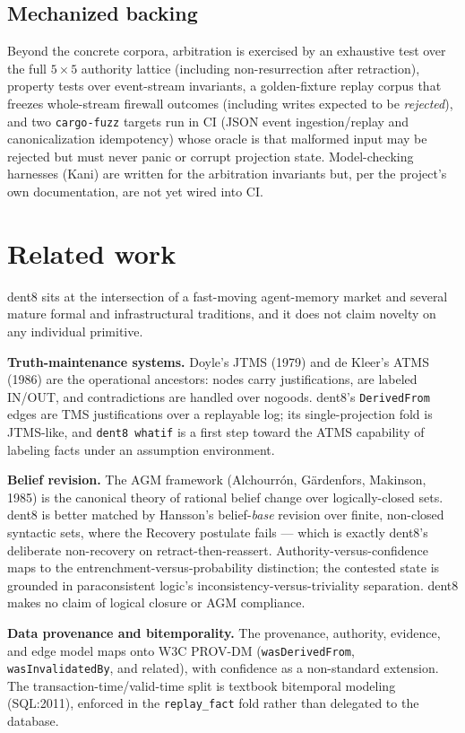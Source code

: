 \documentclass[11pt]{article}
\newcommand{\code}[1]{\texttt{#1}}
\begin{document}
\subsection{Mechanized backing}

Beyond the concrete corpora, arbitration is exercised by an exhaustive test over the full $5\times5$ authority lattice (including non-resurrection after retraction), property tests over event-stream invariants, a golden-fixture replay corpus that freezes whole-stream firewall outcomes (including writes expected to be \emph{rejected}), and two \code{cargo-fuzz} targets run in CI (JSON event ingestion/replay and canonicalization idempotency) whose oracle is that malformed input may be rejected but must never panic or corrupt projection state. Model-checking harnesses (Kani) are written for the arbitration invariants but, per the project's own documentation, are not yet wired into CI.

\section{Related work}

dent8 sits at the intersection of a fast-moving agent-memory market and several mature formal and infrastructural traditions, and it does not claim novelty on any individual primitive.

\textbf{Truth-maintenance systems.} Doyle's JTMS (1979) and de Kleer's ATMS (1986) are the operational ancestors: nodes carry justifications, are labeled IN/OUT, and contradictions are handled over nogoods. dent8's \code{DerivedFrom} edges are TMS justifications over a replayable log; its single-projection fold is JTMS-like, and \code{dent8 whatif} is a first step toward the ATMS capability of labeling facts under an assumption environment.

\textbf{Belief revision.} The AGM framework (Alchourr\'on, G\"ardenfors, Makinson, 1985) is the canonical theory of rational belief change over logically-closed sets. dent8 is better matched by Hansson's belief-\emph{base} revision over finite, non-closed syntactic sets, where the Recovery postulate fails --- which is exactly dent8's deliberate non-recovery on retract-then-reassert. Authority-versus-confidence maps to the entrenchment-versus-probability distinction; the contested state is grounded in paraconsistent logic's inconsistency-versus-triviality separation. dent8 makes no claim of logical closure or AGM compliance.

\textbf{Data provenance and bitemporality.} The provenance, authority, evidence, and edge model maps onto W3C PROV-DM (\code{wasDerivedFrom}, \code{wasInvalidatedBy}, and related), with confidence as a non-standard extension. The transaction-time/valid-time split is textbook bitemporal modeling (SQL:2011), enforced in the \code{replay\_fact} fold rather than delegated to the database.
\end{document}
